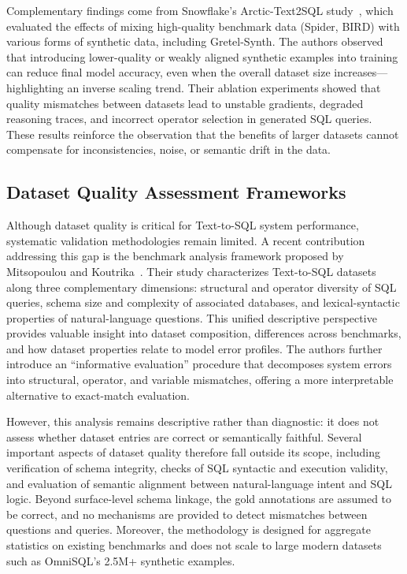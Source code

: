 \documentclass[]{einformatica}
\begin{document}
Complementary findings come from Snowflake's Arctic-Text2SQL study~\cite{yao2025arctic}, which evaluated the effects of mixing high-quality benchmark data (Spider, BIRD) with various forms of synthetic data, including Gretel-Synth. The authors observed that introducing lower-quality or weakly aligned synthetic examples into training can reduce final model accuracy, even when the overall dataset size increases---highlighting an inverse scaling trend. Their ablation experiments showed that quality mismatches between datasets lead to unstable gradients, degraded reasoning traces, and incorrect operator selection in generated SQL queries. These results reinforce the observation that the benefits of larger datasets cannot compensate for inconsistencies, noise, or semantic drift in the data.

\subsection{Dataset Quality Assessment Frameworks}\label{sec:dataset_quality}

Although dataset quality is critical for Text-to-SQL system performance, systematic validation methodologies remain limited. A recent contribution addressing this gap is the benchmark analysis framework proposed by Mitsopoulou and Koutrika~\cite{mitsopoulou2025analysis}. Their study characterizes Text-to-SQL datasets along three complementary dimensions: structural and operator diversity of SQL queries, schema size and complexity of associated databases, and lexical-syntactic properties of natural-language questions. This unified descriptive perspective provides valuable insight into dataset composition, differences across benchmarks, and how dataset properties relate to model error profiles. The authors further introduce an ``informative evaluation'' procedure that decomposes system errors into structural, operator, and variable mismatches, offering a more interpretable alternative to exact-match evaluation.

However, this analysis remains descriptive rather than diagnostic: it does not assess whether dataset entries are correct or semantically faithful. Several important aspects of dataset quality therefore fall outside its scope, including verification of schema integrity, checks of SQL syntactic and execution validity, and evaluation of semantic alignment between natural-language intent and SQL logic. Beyond surface-level schema linkage, the gold annotations are assumed to be correct, and no mechanisms are provided to detect mismatches between questions and queries. Moreover, the methodology is designed for aggregate statistics on existing benchmarks and does not scale to large modern datasets such as OmniSQL's 2.5M+ synthetic examples.
\end{document}
